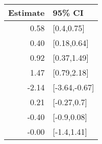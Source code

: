 \begin{tabular}{rl}
  \hline
Estimate & 95\% CI \\ 
  \hline
0.58 & [0.4,0.75] \\ 
  0.40 & [0.18,0.64] \\ 
  0.92 & [0.37,1.49] \\ 
  1.47 & [0.79,2.18] \\ 
  -2.14 & [-3.64,-0.67] \\ 
  0.21 & [-0.27,0.7] \\ 
  -0.40 & [-0.9,0.08] \\ 
  -0.00 & [-1.4,1.41] \\ 
   \hline
\end{tabular}

